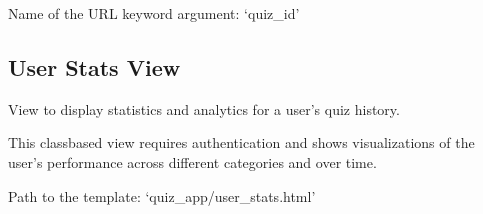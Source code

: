\documentclass[letterpaper,10pt,english]{sphinxmanual}
\begin{document}
\begin{fulllineitems}
\begin{fulllineitems}
\end{fulllineitems}


\begin{fulllineitems}
\label{\detokenize{views:ResultsView.pk_url_kwarg}}
\pysigstartsignatures
\pysigline
{}
\pysigstopsignatures
\sphinxAtStartPar
Name of the URL keyword argument: ‘quiz\_id’

\end{fulllineitems}


\end{fulllineitems}



\subsection{User Stats View}
\label{\detokenize{views:user-stats-view}}

\begin{fulllineitems}
\label{\detokenize{views:UserStatsView}}
\pysigstartsignatures
\pysigline
{}
\pysigstopsignatures
\sphinxAtStartPar
View to display statistics and analytics for a user’s quiz history.

\sphinxAtStartPar
This class\sphinxhyphen{}based view requires authentication and shows visualizations
of the user’s performance across different categories and over time.

\begin{fulllineitems}
\label{\detokenize{views:UserStatsView.template_name}}
\pysigstartsignatures
\pysigline
{}
\pysigstopsignatures
\sphinxAtStartPar
Path to the template: ‘quiz\_app/user\_stats.html’

\end{fulllineitems}


\end{fulllineitems}
\end{document}
